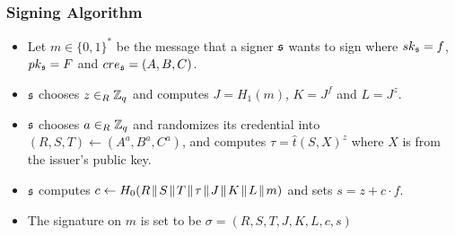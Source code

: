 
\subsubsection*{Signing Algorithm}
\begin{itemize}[align = left, leftmargin=*, label={--}]
\item Let $m \in \{0,1\}^\ast$ be the message that a signer ${\mathfrak s}$ wants to sign where $sk_{\mathfrak s} = f$, $pk_{\mathfrak s} = F$ and $cre_{\mathfrak s} = (A,B,C)$.

\item ${\mathfrak s}$ chooses $z \in_R {\mathbb Z}_q$ and computes $J=H_1(m)$, $K = J^f$ and $L = J^z$.

\item ${\mathfrak s}$ chooses $a \in_R {\mathbb Z}_q$ and randomizes its credential into $(R,S,T) \leftarrow (A^a,B^a,C^a)$, and computes $\tau = \hat{t}(S,X)^z$ where $X$ is from the issuer's public key.

\item ${\mathfrak s}$ computes $c \leftarrow H_0(R \con S \con T \con \tau \con J \con K \con L \con m)$ and sets $s = z + c \cdot f$.

\item The signature on $m$ is set to be $\sigma = (R,S,T,J,K,L,c,s)$


\end{itemize}

